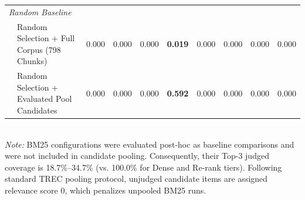 \begin{table}[t]
\begin{tabular}{llcccccccc}
\midrule
\multicolumn{10}{l}{\textit{Random Baseline}} \\
  & Random Selection + Full Corpus (798 Chunks) & 0.000 & 0.000 & 0.000 & \textbf{0.019} & 0.000 & 0.000 & 0.000 & 0.000 \\
  & Random Selection + Evaluated Pool Candidates & 0.000 & 0.000 & 0.000 & \textbf{0.592} & 0.000 & 0.000 & 0.000 & 0.000 \\
\bottomrule
\end{tabular}
\vspace{1mm}\\
\footnotesize{\textit{Note:} BM25 configurations were evaluated post-hoc as baseline comparisons and were not included in candidate pooling. Consequently, their Top-3 judged coverage is 18.7\%--34.7\% (vs. 100.0\% for Dense and Re-rank tiers). Following standard TREC pooling protocol, unjudged candidate items are assigned relevance score 0, which penalizes unpooled BM25 runs.}
\vspace{-2mm}
\end{table}